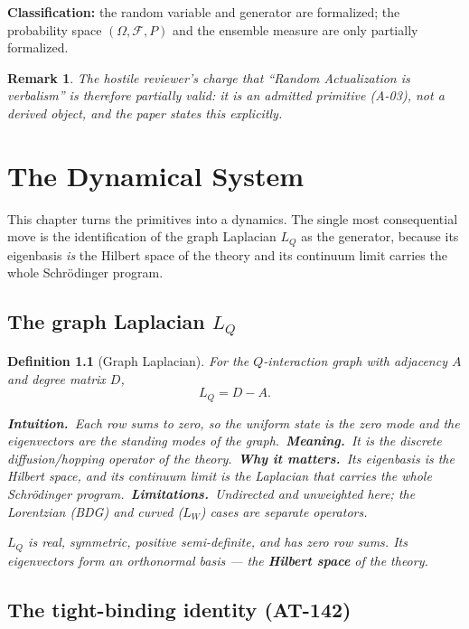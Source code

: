 \documentclass[10pt,twoside,openany]{book}
\newtheorem{definition}[theorem]{Definition}
\newtheorem{remark}[theorem]{Remark}
\newcommand{\eqnotes}[4]{%
  \par\smallskip\noindent
  \textbf{Intuition.}\ #1\ 
  \textbf{Meaning.}\ #2\ 
  \textbf{Why it matters.}\ #3\ 
  \textbf{Limitations.}\ #4\par}
\begin{document}
\textbf{Classification:} the random variable and generator are formalized; the probability
space $(\Omega,\mathcal F,P)$ and the ensemble measure are only partially formalized.

\begin{remark}
The hostile reviewer's charge that ``Random Actualization is verbalism'' is therefore
\emph{partially valid}: it is an \emph{admitted} primitive (A-03), not a derived object,
and the paper states this explicitly.
\end{remark}


\chapter{The Dynamical System}
\label{ch:dynamics}

This chapter turns the primitives into a dynamics. The single most consequential move is
the identification of the graph Laplacian $L_Q$ as the generator, because its eigenbasis
\emph{is} the Hilbert space of the theory and its continuum limit carries the whole
Schr\"odinger program.

\section{The graph Laplacian $L_Q$}

\begin{definition}[Graph Laplacian]
For the $Q$-interaction graph with adjacency $A$ and degree matrix $D$,
\begin{equation}
L_Q = D - A .
\end{equation}

\eqnotes
{Each row sums to zero, so the uniform state is the zero mode and the eigenvectors are the
standing modes of the graph.}
{It is the discrete diffusion/hopping operator of the theory.}
{Its eigenbasis \emph{is} the Hilbert space, and its continuum limit is the Laplacian that
carries the whole Schr\"odinger program.}
{Undirected and unweighted here; the Lorentzian (BDG) and curved ($L_W$) cases are separate
operators.}
$L_Q$ is real, symmetric, positive semi-definite, and has zero row sums. Its eigenvectors
form an orthonormal basis — the \textbf{Hilbert space} of the theory.
\end{definition}

\section{The tight-binding identity (AT-142)}
\end{document}
